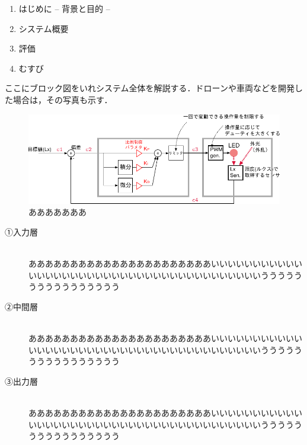 \begin{enumerate}
	\item {\color{gray}はじめに -- 背景と目的 --}
	\item システム概要
	\item 評価
	\item むすび
\end{enumerate}
\newpage


ここにブロック図をいれシステム全体を解説する．ドローンや車両などを開発した場合は，その写真も示す．
\begin{figure}[h]
\begin{center}
\includegraphics[width=\textwidth]{fig/system.pdf}
\caption{あああああああ}
\end{center}
\end{figure}
\newpage

\begin{description} 
	\item[①入力層]~\\
	ああああああああああああああああああああああいいいいいいいいいいいいいいいいいいいいいいいいいいいいいいいいいいいいいいいうううううううううううううううう
	\item[②中間層]~\\
	ああああああああああああああああああああああいいいいいいいいいいいいいいいいいいいいいいいいいいいいいいいいいいいいいいいうううううううううううううううう
	\item[③出力層]~\\
	ああああああああああああああああああああああいいいいいいいいいいいいいいいいいいいいいいいいいいいいいいいいいいいいいいいうううううううううううううううう
\end{description}
\newpage

